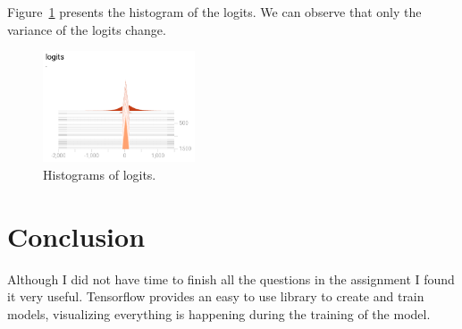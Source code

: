 \documentclass{article}
\begin{document}
Figure~\ref{fig:histogramlogits} presents the histogram of the logits.
We can observe that only the variance of the logits change.

\begin{figure}
\centering
\includegraphics[width=0.4\textwidth]{logits.png}
\caption{Histograms of logits.}
\label{fig:histogramlogits}
\end{figure}


\section{Conclusion}
Although I did not have time to finish all the questions in the assignment I found it very useful.
Tensorflow provides an easy to use library to create and train models, visualizing everything is happening during the training of the model.
\end{document}
